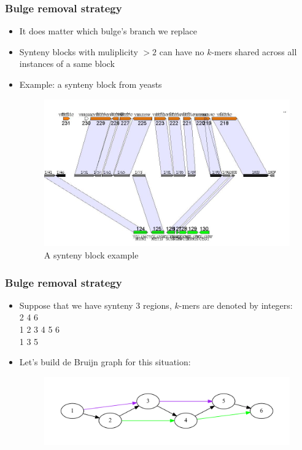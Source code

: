 \documentclass[svgnames,14pt]{beamer}
\begin{document}
\begin{frame}
\frametitle{Bulge removal strategy}
\begin{itemize}
\item It does matter which bulge's branch we replace
\item Synteny blocks with muliplicity \(>2\) can have no \(k\)-mers shared across all instances of a same block
\item Example: a synteny block from yeasts 
\begin{changemargin}{-1.cm}{-1.cm}
\begin{figure}
\centering
\includegraphics[scale = 0.30]{Figure5.png}
\small \caption{A synteny block example}
\end{figure}
\end{changemargin}
\end{itemize}
\end{frame}

\begin{frame}
\frametitle{Bulge removal strategy}
\begin{itemize}
\item Suppose that we have synteny 3 regions, \(k\)-mers are denoted by integers: \\
2 4 6 \\
1 2 3 4 5 6 \\
1 3 5 \\
\item Let's build de Bruijn graph for this situation:
\begin{changemargin}{-1.cm}{-1.cm}
\begin{figure}
\centering
\includegraphics[scale = 0.50]{graph1.pdf}
\end{figure}
\end{changemargin}
\end{itemize}
\end{frame}
\end{document}
